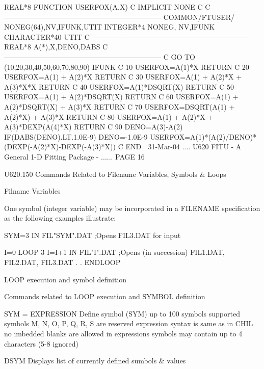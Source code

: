          REAL*8 FUNCTION USERFOX(A,X)
   C
         IMPLICIT NONE
   C
   C     ------------------------------------------------------------------
         COMMON/FTUSER/ NONEG(64),NV,IFUNK,UTIT
         INTEGER*4      NONEG,    NV,IFUNK
         CHARACTER*40                      UTIT
   C     ------------------------------------------------------------------
         REAL*8         A(*),X,DENO,DABS
   C     ------------------------------------------------------------------
   C
         GO TO (10,20,30,40,50,60,70,80,90) IFUNK
   C
      10 USERFOX=A(1)*X
         RETURN
   C
      20 USERFOX=A(1) + A(2)*X
         RETURN
   C
      30 USERFOX=A(1) + A(2)*X + A(3)*X*X
         RETURN
   C
      40 USERFOX=A(1)*DSQRT(X)
         RETURN
   C
      50 USERFOX=A(1) + A(2)*DSQRT(X)
         RETURN
   C
      60 USERFOX=A(1) + A(2)*DSQRT(X) + A(3)*X
         RETURN
   C
      70 USERFOX=DSQRT(A(1) + A(2)*X) + A(3)*X
         RETURN
   C
      80 USERFOX=A(1) + A(2)*X + A(3)*DEXP(A(4)*X)
         RETURN
   C
      90 DENO=A(3)-A(2)
         IF(DABS(DENO).LT.1.0E-9) DENO=-1.0E-9
         USERFOX=A(1)*(A(2)/DENO)*(DEXP(-A(2)*X)-DEXP(-A(3)*X))
   C
         END
    
   31-Mar-04 .... U620  FITU - A General 1-D Fitting Package - ...... PAGE  16
 
 
 
   U620.150  Commands Related to Filename Variables, Symbols & Loops
 
   Filname Variables
 
   One  symbol  (integer  variable)  may  be  incorporated   in   a   FILENAME
   specification as the following examples illustrate:
 
   SYM=3
   IN FIL"SYM".DAT   ;Opens FIL3.DAT for input
 
   I=0
   LOOP 3
   I=I+1
   IN  FIL"I".DAT   ;Opens (in succession)  FIL1.DAT, FIL2.DAT, FIL3.DAT
   .
   .
   ENDLOOP
 
   LOOP execution and symbol definition
 
 
   Commands related to LOOP execution and SYMBOL definition
 
   SYM = EXPRESSION   Define symbol (SYM) up to 100 symbols supported
                      symbols M, N, O, P, Q, R, S are reserved
                      expression syntax is same as in CHIL
                      no imbedded blanks are allowed in expressions
                      symbols may contain up to 4 characters (5-8 ignored)
 
   DSYM               Displays list of currently defined sumbols & values
 
